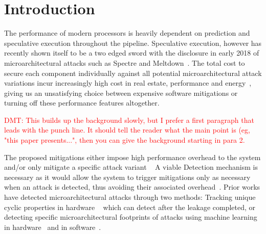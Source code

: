 \section{Introduction} \label{intro}

The performance of modern processors is heavily dependent on prediction and speculative execution throughout the pipeline.  Speculative execution, however has recently shown itself to be a two edged sword with the disclosure in early 2018 of microarchitectural attacks such as Spectre and Meltdown~\cite{spectre, meltdown}. The total cost to secure each component individually against all potential microarchitectural attack variations incur increasingly high cost in real estate, performance and energy~\cite{canella2018systematic, schwarz2019zombieload}, giving us an unsatisfying choice between expensive software mitigations or turning off these performance features altogether.  

\textcolor{red}{DMT: This builds up the background slowly, but I prefer a first paragraph that leads
with the punch line.  It should tell the reader what the main point is (eg, "this paper presents...", then you can give the background
starting in para 2.}
 
The proposed mitigations either impose high performance overhead
to the system and/or only mitigate a specific attack variant
~\cite{taram_csf19, intelanalysis, kiriansky2018dawg, domnitser2012non,saileshwar2019cleanupspec,retpoline, wang2007new, yu2019speculative, yan2018invisispec,CEASER,amd, koruyeh2019speccfi, arm_css}
A viable Detection mechanism is necessary as it would allow the system to trigger 
mitigations only as necessary when an attack is detected, thus avoiding their associated overhead~\cite{gulmezoglu2019fortuneteller, PerSpectron, cyclone2019}.
Prior works have detected microarchitectural attacks through two methods: Tracking unique cyclic properties in hardware ~\cite{cyclone2019} which can detect after the leakage completed, or detecting specific microarchitectural footprints of attacks using machine learning in hardware~\cite{PerSpectron, RHMD2017} and in software~\cite{gulmezoglu2019fortuneteller, cacheBasedDetection2016Chiappetta,
CloudRadar2016,
BlackHatFogh,
payer2016hexpads,
ICCAD2015Wang,
Duppel2013Zhang, 
mushtaq:cel-01824512}. 

